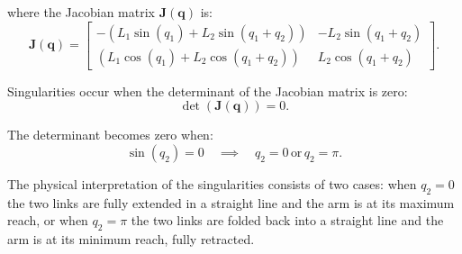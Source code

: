 \documentclass[11pt,american]{article}
\begin{document}
where the Jacobian matrix \( \mathbf{J}(\mathbf{q}) \) is:
\[
\mathbf{J}(\mathbf{q}) =
\begin{bmatrix}
-\left( L_1 \sin(q_1) + L_2 \sin(q_1 + q_2) \right) & -L_2 \sin(q_1 + q_2) \\
\left( L_1 \cos(q_1) + L_2 \cos(q_1 + q_2) \right) & L_2 \cos(q_1 + q_2)
\end{bmatrix}.
\]

Singularities occur when the determinant of the Jacobian matrix is zero:
\[
\det(\mathbf{J}(\mathbf{q})) = 0.
\]

The determinant becomes zero when:
\[
\sin(q_2) = 0 \quad \implies \quad q_2 = 0 \, \text{or} \, q_2 = \pi.
\]

The physical interpretation of the singularities consists of two cases: when \( q_2 = 0 \) the two links are fully extended in a straight line and the arm is at its maximum reach, or when \( q_2 = \pi \) the two links are folded back into a straight line and the arm is at its minimum reach, fully retracted.
\end{document}
